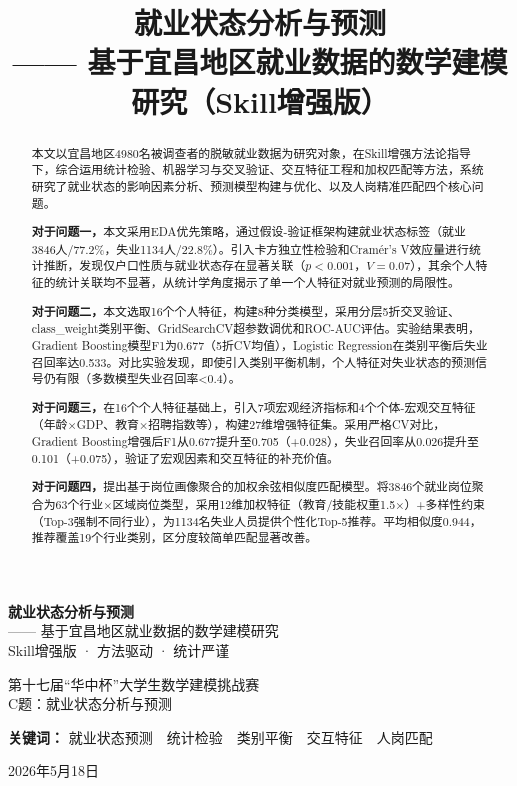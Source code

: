 \documentclass[withoutpreface,bwprint]{cumcmthesis}
\title{就业状态分析与预测\\
\large —— 基于宜昌地区就业数据的数学建模研究（Skill增强版）}
\begin{document}
\begin{titlepage}
\thispagestyle{empty}
\vspace*{3cm}
\begin{center}
{\bfseries\songti 就业状态分析与预测\\[12pt]}
{\kaishu —— 基于宜昌地区就业数据的数学建模研究\\[12pt]}
{ Skill增强版 · 方法驱动 · 统计严谨\\[36pt]}

{\heiti 第十七届“华中杯”大学生数学建模挑战赛\\[8pt]}
{C题：就业状态分析与预测\\[36pt]}

{\songti
\textbf{关键词：} 就业状态预测~~统计检验~~类别平衡~~交互特征~~人岗匹配
}

\vfill
{\songti 2026年5月18日}
\end{center}
\end{titlepage}

\tableofcontents
\newpage

\begin{abstract}
本文以宜昌地区4980名被调查者的脱敏就业数据为研究对象，在Skill增强方法论指导下，综合运用统计检验、机器学习与交叉验证、交互特征工程和加权匹配等方法，系统研究了就业状态的影响因素分析、预测模型构建与优化、以及人岗精准匹配四个核心问题。

\textbf{对于问题一，}本文采用EDA优先策略，通过假设-验证框架构建就业状态标签（就业3846人/77.2\%，失业1134人/22.8\%）。引入卡方独立性检验和Cramér's V效应量进行统计推断，发现仅户口性质与就业状态存在显著关联（$p<0.001$，$V=0.07$），其余个人特征的统计关联均不显著，从统计学角度揭示了单一个人特征对就业预测的局限性。

\textbf{对于问题二，}本文选取16个个人特征，构建8种分类模型，采用分层5折交叉验证、class\_weight类别平衡、GridSearchCV超参数调优和ROC-AUC评估。实验结果表明，Gradient Boosting模型F1为0.677（5折CV均值），Logistic Regression在类别平衡后失业召回率达0.533。对比实验发现，即使引入类别平衡机制，个人特征对失业状态的预测信号仍有限（多数模型失业召回率<0.4）。

\textbf{对于问题三，}在16个个人特征基础上，引入7项宏观经济指标和4个个体-宏观交互特征（年龄×GDP、教育×招聘指数等），构建27维增强特征集。采用严格CV对比，Gradient Boosting增强后F1从0.677提升至0.705（+0.028），失业召回率从0.026提升至0.101（+0.075），验证了宏观因素和交互特征的补充价值。

\textbf{对于问题四，}提出基于岗位画像聚合的加权余弦相似度匹配模型。将3846个就业岗位聚合为63个行业×区域岗位类型，采用12维加权特征（教育/技能权重1.5×）+多样性约束（Top-3强制不同行业），为1134名失业人员提供个性化Top-5推荐。平均相似度0.944，推荐覆盖19个行业类别，区分度较简单匹配显著改善。

\end{abstract}
\end{document}
